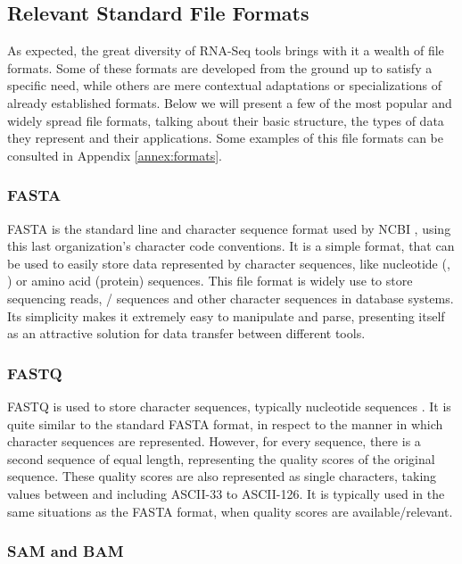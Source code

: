 \subsection{Relevant Standard File Formats}\label{sec:formats}

As expected, the great diversity of RNA-Seq tools brings with it a wealth of
file formats. Some of these formats are developed from the ground up to satisfy
a specific need, while others are mere contextual adaptations or specializations
of already established formats. Below we will present a few of the most popular
and widely spread file formats, talking about their basic structure, the types
of data they represent and their applications. Some examples of this file
formats can be consulted in Appendix \ref{annex:formats}.

\subsubsection*{FASTA}

FASTA is the standard line and character sequence format used by NCBI
\cite{ncbi:fasta}, using this last organization's character code conventions. It
is a simple format, that can be used to easily store data represented by
character sequences, like nucleotide (\dna, \rna) or amino acid (protein)
sequences. This file format is widely use to store sequencing reads, \dna/\rna{}
sequences and other character sequences in database systems. Its simplicity
makes it extremely easy to manipulate and parse, presenting itself as an
attractive solution for data transfer between different tools.

\subsubsection*{FASTQ}

FASTQ is used to store character sequences, typically nucleotide sequences
\cite{Cock2010}. It is quite similar to the standard FASTA format, in respect to
the manner in which character sequences are represented. However, for every
sequence, there is a second sequence of equal length, representing the quality
scores of the original sequence. These quality scores are also represented as
single characters, taking values between and including ASCII-33 to ASCII-126. It
is typically used in the same situations as the FASTA format, when quality
scores are available/relevant.

\subsubsection*{SAM and BAM}

